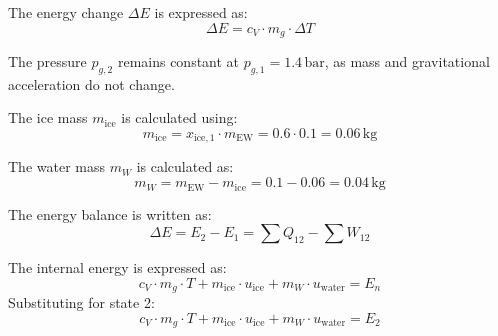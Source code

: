 The energy change \( \Delta E \) is expressed as:  
\[
\Delta E = c_V \cdot m_g \cdot \Delta T
\]  

The pressure \( p_{g,2} \) remains constant at \( p_{g,1} = 1.4 \, \text{bar} \), as mass and gravitational acceleration do not change.  

The ice mass \( m_{\text{ice}} \) is calculated using:  
\[
m_{\text{ice}} = x_{\text{ice},1} \cdot m_{\text{EW}} = 0.6 \cdot 0.1 = 0.06 \, \text{kg}
\]  

The water mass \( m_W \) is calculated as:  
\[
m_W = m_{\text{EW}} - m_{\text{ice}} = 0.1 - 0.06 = 0.04 \, \text{kg}
\]  

The energy balance is written as:  
\[
\Delta E = E_2 - E_1 = \sum Q_{12} - \sum W_{12}
\]  

The internal energy is expressed as:  
\[
c_V \cdot m_g \cdot T + m_{\text{ice}} \cdot u_{\text{ice}} + m_W \cdot u_{\text{water}} = E_n
\]  
Substituting for state 2:  
\[
c_V \cdot m_g \cdot T + m_{\text{ice}} \cdot u_{\text{ice}} + m_W \cdot u_{\text{water}} = E_2
\]